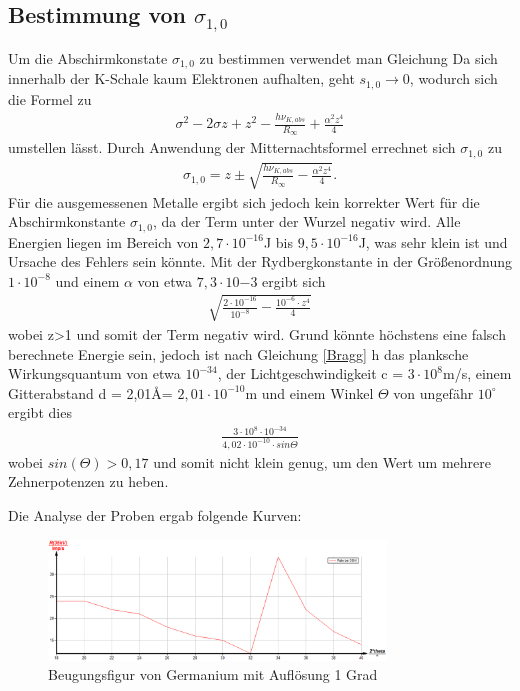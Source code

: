 \subsection{Bestimmung von $\sigma_{1,0}$}
Um die Abschirmkonstate $\sigma_{1,0}$ zu bestimmen verwendet man Gleichung %
Da sich innerhalb der K-Schale kaum Elektronen aufhalten, geht $s_{1,0}\rightarrow 0$, wodurch sich die Formel zu
\begin{align}
\sigma^2-2\sigma z+z^2-\frac{h\nu_{K,abs}}{R_\infty}+\frac{\alpha^2z^4}{4}
\end{align}
umstellen lässt.
Durch Anwendung der Mitternachtsformel errechnet sich $\sigma_{1,0}$ zu
\begin{align}
\sigma_{1,0}=z\pm\sqrt{\frac{h\nu_{K,abs}}{R_\infty}-\frac{\alpha^2z^4}{4}}.
\end{align}
Für die ausgemessenen Metalle ergibt sich jedoch kein korrekter Wert für die Abschirmkonstante $\sigma_{1,0}$, da der 
Term unter der Wurzel negativ wird. Alle Energien liegen im Bereich von $2,7\cdot10^{-16}$J bis  
$9,5\cdot10^{-16}$J, was sehr klein ist und Ursache des Fehlers sein könnte. Mit der Rydbergkonstante in der Größenordnung $1\cdot 10^{-8}$ und einem $\alpha$ von etwa 
$7,3\cdot 10{-3}$ ergibt sich
\begin{align*}
\sqrt{\frac{2\cdot10^{-16}}{10^{-8}}-\frac{10^{-6}\cdot z^4}{4}}
\end{align*}
wobei z>1 und somit der Term negativ wird. Grund könnte höchstens eine falsch berechnete Energie sein, jedoch ist nach Gleichung \ref{Bragg} h das planksche Wirkungsquantum von etwa $10^{-34}$, der Lichtgeschwindigkeit c = $3\cdot10^{8}$m/s, einem Gitterabstand d = 2,01\AA = $2,01\cdot10^{-10}$m und einem Winkel $\Theta$ von ungefähr $10^\circ$ ergibt dies
\begin{align*}
\frac{3\cdot10^{8}\cdot10^{-34}}{4,02\cdot10^{-10}\cdot sin\Theta}
\end{align*}
wobei $sin(\Theta)>0,17$ und somit nicht klein genug, um den Wert um mehrere Zehnerpotenzen zu heben.

Die Analyse der Proben ergab folgende Kurven:

\begin{figure}[H]
\includegraphics[width=0.8\textwidth] {pics/germanium01.png}
\centering
\caption{Beugungsfigur von Germanium mit Auflösung 1 Grad}
\label{Aufbau}
\end{figure}

